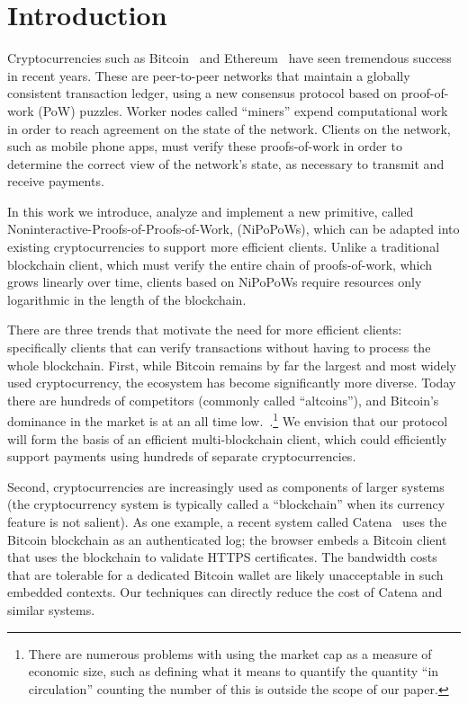 \section{Introduction}
Cryptocurrencies such as Bitcoin~\cite{bitcoin} and Ethereum~\cite{ethereum} have seen tremendous success in recent years.
These are peer-to-peer networks that maintain a globally consistent transaction ledger, using a new consensus protocol based on proof-of-work (PoW) puzzles. Worker nodes called ``miners'' expend computational work in order to reach agreement on the state of the network.
Clients on the network, such as mobile phone apps, must verify these proofs-of-work in order to determine the correct view of the network's state, as necessary to transmit and receive payments.

In this work we introduce, analyze and implement  a new primitive, called Noninteractive-Proofs-of-Proofs-of-Work, (NiPoPoWs), which can be adapted into existing cryptocurrencies to support more efficient clients.
Unlike a traditional blockchain client, which must verify the entire chain of proofs-of-work, which grows linearly over time, clients based on NiPoPoWs require resources only logarithmic in the length of the blockchain.

There are three trends that motivate the need for more efficient clients: specifically clients that can verify transactions without having to process the whole blockchain. 
First, while Bitcoin remains by far the largest and most widely used cryptocurrency, the ecosystem has become significantly more diverse. Today there are hundreds of competitors (commonly called ``altcoins''), and Bitcoin's dominance in the market is at an all time low.~\cite{marketcap}.\footnote{There are numerous problems with using the market cap as a measure of economic size, such as defining what it means to quantify the quantity ``in circulation'' counting the number of this is outside the scope of our paper.}
  We envision that our protocol will form the basis of an efficient multi-blockchain client, which could efficiently support payments using hundreds of separate cryptocurrencies.

  Second, cryptocurrencies are increasingly used as components of larger systems (the cryptocurrency system is typically called a ``blockchain'' when its currency feature is not salient).
  As one example, a recent system called Catena~\cite{catena} uses the Bitcoin blockchain as an authenticated log; the browser embeds a Bitcoin client that uses the blockchain to validate HTTPS certificates.
  The bandwidth costs that are tolerable for a dedicated Bitcoin wallet are likely unacceptable in such embedded contexts. Our techniques can directly reduce the cost of Catena and similar systems.

